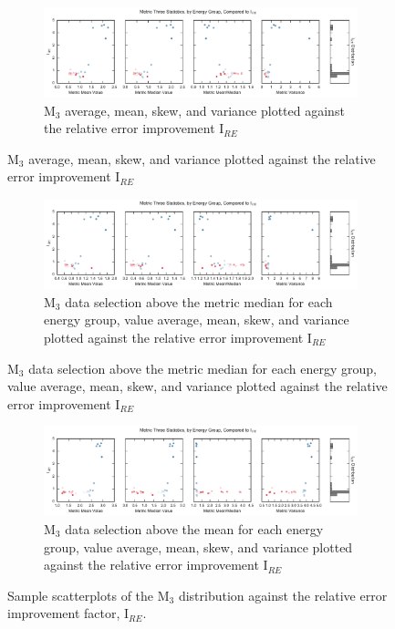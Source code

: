 \begin{figure}[htb!]
  \centering
  \begin{subfigure}[t]{\textwidth}
    \centering
    \includegraphics[width=\linewidth]{./chapters/characterization_probs/figures/sample_data/metric_three_err_stats_full.pdf}
    \caption{M$_3$ average, mean, skew, and variance plotted against the
      relative error improvement I$_{RE}$}
    \label{fig:samplestatsfullM3}
  \end{subfigure}
\end{figure}
\begin{figure}[htb!]\ContinuedFloat
  \centering
  \begin{subfigure}[t]{\textwidth}
    \centering
    \includegraphics[width=\linewidth]{./chapters/characterization_probs/figures/sample_data/metric_three_err_stats_median.pdf}
    \caption{M$_3$ data selection above the metric median for each energy group,
      value average, mean, skew, and variance plotted against the
      relative error improvement I$_{RE}$}
    \label{fig:samplestatsmedianM3}
  \end{subfigure}
\end{figure}
\begin{figure}[htb!]\ContinuedFloat
  \centering
  \begin{subfigure}[t]{\textwidth}
    \centering
    \includegraphics[width=\linewidth]{./chapters/characterization_probs/figures/sample_data/metric_three_err_stats_mean.pdf}
    \caption{M$_3$ data selection above the mean for each energy group,
      value average, mean, skew, and variance plotted against the
      relative error improvement I$_{RE}$ }
    \label{fig:samplestatsmeanM3}
  \end{subfigure}
  \caption[Sample scatterplots of M$_3$ distribution against the relative error
  improvement factor, I$_{RE}$.]
  {Sample scatterplots of the M$_3$ distribution against the relative error
    improvement factor, I$_{RE}$.}
  \label{fig:samplestats}
\end{figure}

